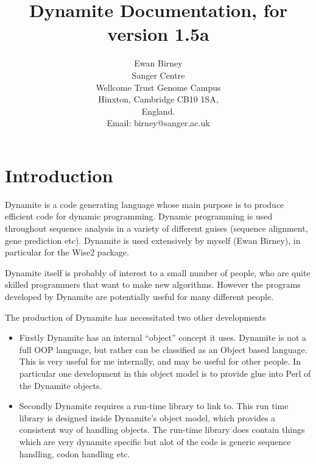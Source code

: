 

\newcommand{\programtext}[1]{{\tt #1}}

\title{Dynamite Documentation, for version 1.5a}
\author{Ewan Birney\\
Sanger Centre\\
Wellcome Trust Genome Campus\\
Hinxton, Cambridge CB10 1SA,\\
England.\\
Email: birney@sanger.ac.uk}

\maketitle
 
\newpage
\tableofcontents
\newpage

\section{Introduction}
Dynamite is a code generating language whose main purpose is to produce
efficient code for dynamic programming. Dynamic programming is used
throughout sequence analysis in a variety of different guises
(sequence alignment, gene prediction etc). Dynamite is used extensively
by myself (Ewan Birney), in particular for the Wise2 package.  

Dynamite itself is probably of interest to a small number of people,
who are quite skilled programmers that want to make new algorithms.
However the programs developed by Dynamite are potentially useful for
many different people.


The production of Dynamite has necessitated two other developments
\begin{itemize}
\item Firstly Dynamite has an internal ``object'' concept it uses. Dynamite is
not a full OOP language, but rather can be classified as an Object based
language. This is very useful for me internally, and may be useful for
other people. In particular one development in this object model is to
provide glue into Perl of the Dynamite objects.
\item Secondly Dynamite requires a run-time library to link to. This run time
library is designed inside Dynamite's object model, which provides a
consistent way of handling objects. The run-time library does contain
things which are very dynamite specific but alot of the code is generic
sequence handling, codon handling etc.
\end{itemize}
